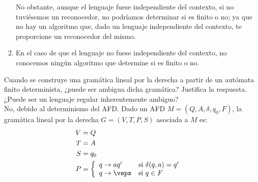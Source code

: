 \documentclass[12pt]{article}
\begin{document}
\begin{ejercicio}[1.25 puntos]
\begin{enumerate}
            No obstante, aunque el lenguaje fuese independiente del contexto, si no tuviésemos un reconocedor, no podríamos determinar si es finito o no; ya que no hay un algoritmo que, dado un lenguaje independiente del contexto, te proporcione un reconocedor del mismo.

            \item En el caso de que el lenguaje no fuese independiente del contexto, no conocemos ningún algoritmo que determine si es finito o no.
        \end{enumerate}
    \end{ejercicio}

    \begin{ejercicio}[1.25 puntos]
        Cuando se construye una gramática lineal por la derecha a partir de un autómata finito determinista, ¿puede ser ambigua
        dicha gramática? Justifica la respuesta. ¿Puede ser un lenguaje regular inherentemente ambiguo?\\

        No, debido al determinismo del AFD. Dado un AFD $M=(Q,A,\delta,q_0,F)$, la gramática lineal por la derecha $G=(V,T,P,S)$ asociada a $M$ es:
        \begin{align*}
            V&=Q\\
            T&=A \\
            S&=q_0 \\
            P&=\left\{
                \begin{array}{ll}
                    q\to aq' & \text{si } \delta(q,a)=q' \\
                    q\to \veps & \text{si } q\in F
                \end{array}
            \right.
        \end{align*}


\end{ejercicio}
\end{document}

